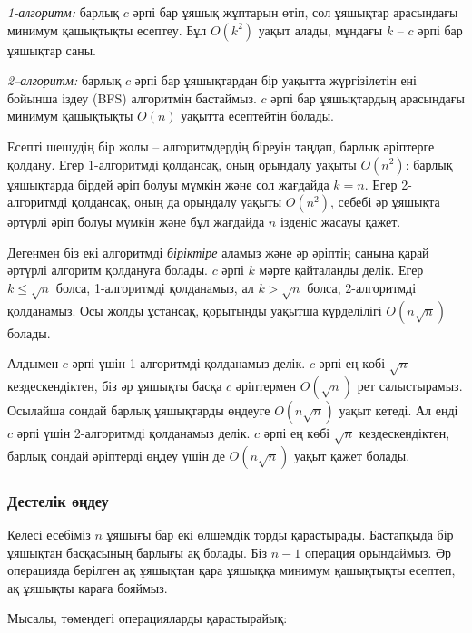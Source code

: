 \emph{1-алгоритм:} барлық $c$ әрпі бар ұяшық жұптарын өтіп,
сол ұяшықтар арасындағы минимум қашықтықты есептеу. Бұл $O(k^2)$ уақыт алады, мұндағы
$k$ -- $c$ әрпі бар ұяшықтар саны. 

\emph{2–алгоритм:} барлық $c$ әрпі бар ұяшықтардан бір уақытта жүргізілетін
ені бойынша іздеу (BFS) алгоритмін бастаймыз. $c$ әрпі бар ұяшықтардың
арасындағы минимум қашықтықты $O(n)$ уақытта есептейтін болады. 

Есепті шешудің бір жолы -- алгоритмдердің біреуін таңдап,
барлық әріптерге қолдану. Егер 1-алгоритмді қолдансақ,
оның орындалу уақыты $O(n^2)$: барлық ұяшықтарда
бірдей әріп болуы мүмкін және сол жағдайда $k=n$.
Егер 2-алгоритмді қолдансақ, оның да орындалу уақыты
$O(n^2)$, себебі әр ұяшықта әртүрлі әріп
болуы мүмкін және бұл жағдайда $n$ ізденіс жасауы қажет. 

Дегенмен біз екі алгоритмді \emph{біріктіре} аламыз
және әр әріптің санына қарай әртүрлі алгоритм қолдануға
болады. $c$ әрпі $k$ мәрте қайталанды делік. Егер $k \le \sqrt n$ болса,
1-алгоритмді қолданамыз, ал $k > \sqrt n$ болса, 
2-алгоритмді қолданамыз. Осы жолды ұстансақ, қорытынды 
уақытша күрделілігі $O(n \sqrt n)$ болады. 

Алдымен $c$ әрпі үшін 1-алгоритмді қолданамыз делік.
$c$ әрпі ең көбі $\sqrt n$ кездескендіктен, 
біз әр ұяшықты басқа $c$ әріптермен $O(\sqrt n)$ 
рет салыстырамыз. Осылайша  сондай барлық ұяшықтарды
өңдеуге $O(n \sqrt n)$ уақыт кетеді. Ал енді 
$c$ әрпі үшін 2-алгоритмді қолданамыз делік.
$c$ әрпі ең көбі $\sqrt n$ кездескендіктен, 
барлық сондай әріптерді өңдеу үшін де $O(n \sqrt n)$ 
уақыт қажет болады.

\subsubsection{Дестелік өңдеу}

Келесі есебіміз $n$ ұяшығы бар 
екі өлшемдік торды қарастырады. 
Бастапқыда бір ұяшықтан басқасының барлығы
ақ болады. Біз $n-1$ операция орындаймыз.
Әр операцияда берілген ақ ұяшықтан қара ұяшыққа 
минимум қашықтықты есептеп, ақ ұяшықты қараға бояймыз. 

Мысалы, төмендегі операцияларды қарастырайық:

\begin{center}
\end{center}

